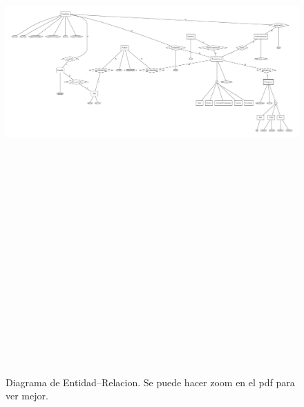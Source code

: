 \begin{figure}[H]
 \centering
 \includegraphics[angle=90,height=23cm]{../mer/mer-dot.pdf}
 \caption{Diagrama de Entidad--Relacion. Se puede hacer zoom en el pdf para ver mejor.}
\end{figure}

